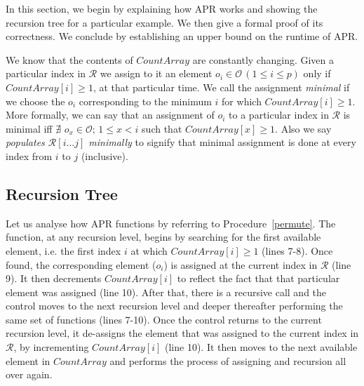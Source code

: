 \documentclass{article}
\begin{document}
In this section, we begin by explaining how APR works and showing the recursion tree for a particular example. We then give a formal proof of its correctness. We conclude by establishing an upper bound on the runtime of APR.

We know that the contents of $CountArray$ are constantly changing. Given a particular index in $\mathcal{R}$ we assign to it an element $o_i \in \mathcal{O}\,(1 \le i \le p)$ only if $CountArray[i] \ge 1$, at that particular time. We call the assignment \emph{minimal} if we choose the $o_i$ corresponding to the minimum $i$ for which $CountArray[i] \ge 1$. More formally, we can say that an assignment of $o_i$ to a particular index in $\mathcal{R}$ is minimal iff $\nexists\,\,o_x \in \mathcal{O};\,1 \le x < i$ such that $CountArray[x] \ge 1$. Also we say \emph{populates $\mathcal{R}[i \ldots j]$ minimally} to signify that minimal assignment is done at every index from $i$ to $j$ (inclusive).

\subsection{Recursion Tree}
\label{subsec:rectree}

Let us analyse how APR functions by referring to Procedure~\ref{permute}. The function, at any recursion level, begins by searching for the first available element, i.e. the first index $i$ at which $CountArray[i] \ge 1$ (lines 7-8). Once found, the corresponding element ($o_i$) is assigned at the current index in $\mathcal{R}$ (line 9). It then decrements $CountArray[i]$ to reflect the fact that that particular element was assigned (line 10). After that, there is a recursive call and the control moves to the next recursion level and deeper thereafter performing the same set of functions (lines 7-10). Once the control returns to the current recursion level, it de-assigns the element that was assigned to the current index in $\mathcal{R}$, by incrementing $CountArray[i]$ (line 10). It then moves to the next available element in $CountArray$ and performs the process of assigning and recursion all over again.
\end{document}
